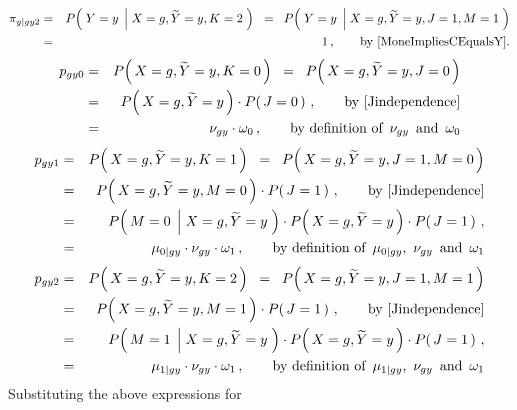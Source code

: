 \begin{eqnarray*}
\pi_{y \vert gy2}
&=&
	P\!\left(\;Y=y\;\left\vert\;X=g,\widetilde{Y}=y,K=2\right.\,\right)
\;\;=\;\;
	P\!\left(\;Y=y\;\left\vert\;X=g,\widetilde{Y}=y,J=1,M=1\right.\,\right)
\\
&=&
	1\,,
	\quad\quad
	\textnormal{by \eqref{MoneImpliesCEqualsY}.}
\end{eqnarray*}
\begin{eqnarray*}
p_{gy0}
&=&
	P\!\left(\,X=g,\widetilde{Y}=y,K=0\,\right)
\;\;=\;\;
	P\!\left(\,X=g,\widetilde{Y}=y,J=0\,\right)
\\
&=&
	P\!\left(\,X=g,\widetilde{Y}=y\,\right)
	\cdot
	P\!\left(\,J=0\,\right)\,,
	\quad\quad
	\textnormal{by \eqref{Jindependence}}
\\
&=&
	\nu_{gy}
	\cdot
	\omega_{0}\,,
	\quad\quad
	\textnormal{by definition of \,$\nu_{gy}$\, and \,$\omega_{0}$}
\end{eqnarray*}
\begin{eqnarray*}
p_{gy1}
&=&
	P\!\left(\,X=g,\widetilde{Y}=y,K=1\,\right)
\;\;=\;\;
	P\!\left(\,X=g,\widetilde{Y}=y,J=1,M=0\,\right)
\\
&=&
	P\!\left(\,X=g,\widetilde{Y}=y,M=0\,\right)
	\cdot
	P\!\left(\,J=1\,\right)\,,
	\quad\quad
	\textnormal{by \eqref{Jindependence}}
\\
&=&
	P\!\left(\,M=0\;\left\vert\;X=g,\widetilde{Y}=y\right.\,\right)
	\cdot
	P\!\left(\,X=g,\widetilde{Y}=y\,\right)
	\cdot
	P\!\left(\,J=1\,\right)\,,
\\
&=&
	\mu_{0 \vert gy}
	\cdot
	\nu_{gy}
	\cdot
	\omega_{1}\,,
	\quad\quad
	\textnormal{by definition of \,$\mu_{0 \vert gy}$, \,$\nu_{gy}$\, and \,$\omega_{1}$}
\end{eqnarray*}
\begin{eqnarray*}
p_{gy2}
&=&
	P\!\left(\,X=g,\widetilde{Y}=y,K=2\,\right)
\;\;=\;\;
	P\!\left(\,X=g,\widetilde{Y}=y,J=1,M=1\,\right)
\\
&=&
	P\!\left(\,X=g,\widetilde{Y}=y,M=1\,\right)
	\cdot
	P\!\left(\,J=1\,\right)\,,
	\quad\quad
	\textnormal{by \eqref{Jindependence}}
\\
&=&
	P\!\left(\,M=1\;\left\vert\;X=g,\widetilde{Y}=y\right.\,\right)
	\cdot
	P\!\left(\,X=g,\widetilde{Y}=y\,\right)
	\cdot
	P\!\left(\,J=1\,\right)\,,
\\
&=&
	\mu_{1 \vert gy}
	\cdot
	\nu_{gy}
	\cdot
	\omega_{1}\,,
	\quad\quad
	\textnormal{by definition of \,$\mu_{1 \vert gy}$, \,$\nu_{gy}$\, and \,$\omega_{1}$}
\end{eqnarray*}
Substituting the above expressions for
